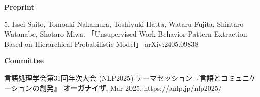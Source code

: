 \documentclass[a4paper,10pt]{article}
\begin{document}
\vspace{10pt}

\noindent
\begin{minipage}[t]{0.3\textwidth}
    \textbf{Preprint}
\end{minipage}%
\begin{minipage}[t]{0.7\textwidth}
    5. Issei Saito, Tomoaki Nakamura, Toshiyuki Hatta, Wataru Fujita, Shintaro Watanabe, Shotaro Miwa.  
       「Unsupervised Work Behavior Pattern Extraction Based on Hierarchical Probabilistic Model」  
       arXiv:2405.09838
\end{minipage}

\vspace{10pt}

\noindent
\begin{minipage}[t]{0.3\textwidth}
    \textbf{Committee}
\end{minipage}%
\begin{minipage}[t]{0.7\textwidth}
言語処理学会第31回年次大会 (NLP2025) テーマセッション『言語とコミュニケーションの創発』 \textbf{オーガナイザ}, Mar 2025. https://anlp.jp/nlp2025/
\end{minipage}
\end{document}

